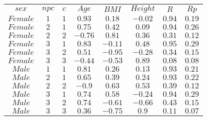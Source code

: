 \begin{tabular}{cccccccc}
$sex$ & $npc$ & $c$ & $Age$ & $BMI$ & $Height$ & $R$ & $Rp$\\
$Female$ & $1$ & $1$ & $0.93$ & $0.18$ & $-0.02$ & $0.94$ & $0.19$\\
$Female$ & $2$ & $1$ & $0.75$ & $0.42$ & $0.09$ & $0.94$ & $0.26$\\
$Female$ & $2$ & $2$ & $-0.76$ & $0.81$ & $0.36$ & $0.31$ & $0.12$\\
$Female$ & $3$ & $1$ & $0.83$ & $-0.11$ & $0.48$ & $0.95$ & $0.29$\\
$Female$ & $3$ & $2$ & $0.51$ & $-0.95$ & $-0.28$ & $0.34$ & $0.15$\\
$Female$ & $3$ & $3$ & $-0.44$ & $-0.53$ & $0.89$ & $0.08$ & $0.08$\\
$Male$ & $1$ & $1$ & $0.81$ & $0.26$ & $0.13$ & $0.93$ & $0.21$\\
$Male$ & $2$ & $1$ & $0.65$ & $0.39$ & $0.24$ & $0.93$ & $0.22$\\
$Male$ & $2$ & $2$ & $-0.9$ & $0.63$ & $0.53$ & $0.39$ & $0.12$\\
$Male$ & $3$ & $1$ & $0.74$ & $0.58$ & $-0.24$ & $0.94$ & $0.29$\\
$Male$ & $3$ & $2$ & $0.74$ & $-0.61$ & $-0.66$ & $0.43$ & $0.15$\\
$Male$ & $3$ & $3$ & $0.36$ & $-0.75$ & $0.9$ & $0.11$ & $0.07$\\
\end{tabular}
